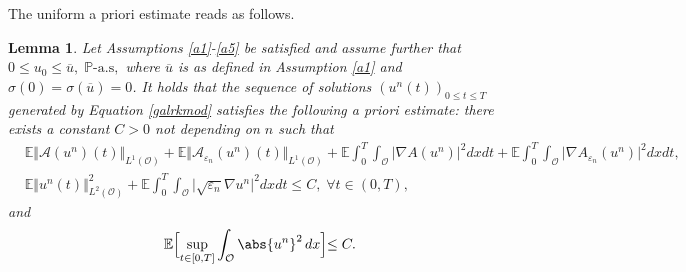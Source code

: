 \documentclass[10pt,number,preprint,times]{elsarticle}
\numberwithin{equation}{section} %
\newtheorem{lem}{Lemma}[section]
\newcommand{\E}{\ensuremath{\Bbb{E}}}
\begin{document}
\noindent The uniform a priori estimate reads as follows.
\begin{lem}\label{lémmaaprioriés}
	Let Assumptions \ref{a1}-\ref{a5} be satisfied and assume further that $0 \leq u_0 \leq \overline{u},\; \mathbb{P}\text{-a.s},$ where $\overline{u}$ is as defined in Assumption \ref{a1} and $\sigma(0)=\sigma(\overline{u})=0$. It holds that the sequence of solutions  $\left(u^n(t)\right)_{0 \leq t \leq T}$ generated by Equation \eqref{galrkmod} satisfies the following a priori estimate: there exists a constant $C>0$ not depending on $n$ such that
\begin{equation}\label{apriori}
\begin{split}
& \mathbb{E} \Vert \mathcal{A}(u^n)(t) \Vert_{L^1(\mathcal{O})}
+\mathbb{E} \Vert \mathcal{A}_{\varepsilon_n}(u^n)(t) \Vert_{L^1(\mathcal{O})}+
 \mathbb{E} \displaystyle \int_0^T \int_{\mathcal{O}} \vert \nabla A(u^n) \vert^2 dxdt+\mathbb{E} \displaystyle \int_0^T \int_{\mathcal{O}} \vert \nabla A_{\varepsilon_n}(u^n) \vert^2 dxdt,\\
&\mathbb{E}  \Vert u^n(t) \Vert_{L^2(\mathcal{O})}^2
+\mathbb{E} \displaystyle \int_0^T \int_{\mathcal{O}} \vert \sqrt{\varepsilon_n}\nabla u^n \vert^2 dxdt \leq C, \; \forall t \in (0,T),
 \end{split}
\end{equation}
and
\begin{equation}\label{apriori-sup}
 \E \Bigl[\sup_{t\in [0,T]}\int_{\mathcal O} \abs{u^n}^2\,dx\Bigl]\leq C.
\end{equation}

\end{lem}
\end{document}
